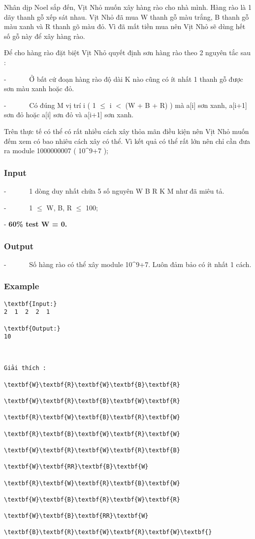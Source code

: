 



   Nhân dịp Noel sắp đến, Vịt Nhỏ muốn xây hàng rào cho nhà mình. Hàng rào là 1 dãy thanh gỗ xếp sát nhau. Vịt Nhỏ đã mua W thanh gỗ màu trắng, B thanh gỗ màu xanh và R thanh gõ màu đỏ. Vì đã mất tiền mua nên Vịt Nhỏ sẽ dùng hết số gỗ này để xây hàng rào.  

   Để cho hàng rào đặt biệt Vịt Nhỏ quyết định sơn hàng rào theo 2 nguyên tắc sau :  

   -       Ở bất cứ đoạn hàng rào độ dài K nào cũng có ít nhất 1 thanh gỗ được sơn màu xanh hoặc đỏ.  

   -       Có đúng M vị trí i ( 1  $\le$  i $<$ (W + B + R) ) mà a[i] sơn xanh, a[i+1] sơn đỏ hoặc a[i] sơn đỏ và a[i+1] sơn xanh.  

   Trên thực tế có thể có rất nhiều cách xây thỏa mãn điều kiện nên Vịt Nhỏ muốn đếm xem có bao nhiêu cách xây có thể. Vì kết quả có thể rất lớn nên chỉ cần đưa ra module 1000000007 ( 10^9+7 );  

\subsubsection{   Input  }

   -       1 dòng duy nhất chứa 5 số nguyên W B R K M như đã miêu tả.  

   -       1  $\le$  W, B, R  $\le$  100;  

   -   \textbf{    60\% test W = 0.   }

\subsubsection{   Output  }

   -       Số hàng rào có thể xây module 10^9+7. Luôn đảm bảo có ít nhất 1 cách.  

\subsubsection{   Example  }
\begin{verbatim}
\textbf{Input:}
2  1  2  2  1

\textbf{Output:}
10\end{verbatim}
\begin{verbatim}


Giải thích :

\textbf{W}\textbf{R}\textbf{W}\textbf{B}\textbf{R}

\textbf{W}\textbf{R}\textbf{B}\textbf{W}\textbf{R}

\textbf{R}\textbf{W}\textbf{B}\textbf{R}\textbf{W}

\textbf{R}\textbf{B}\textbf{W}\textbf{R}\textbf{W}

\textbf{W}\textbf{R}\textbf{W}\textbf{R}\textbf{B}

\textbf{W}\textbf{RR}\textbf{B}\textbf{W}

\textbf{R}\textbf{W}\textbf{R}\textbf{B}\textbf{W}

\textbf{W}\textbf{B}\textbf{R}\textbf{W}\textbf{R}

\textbf{W}\textbf{B}\textbf{RR}\textbf{W}

\textbf{B}\textbf{R}\textbf{W}\textbf{R}\textbf{W}\textbf{}\end{verbatim}
